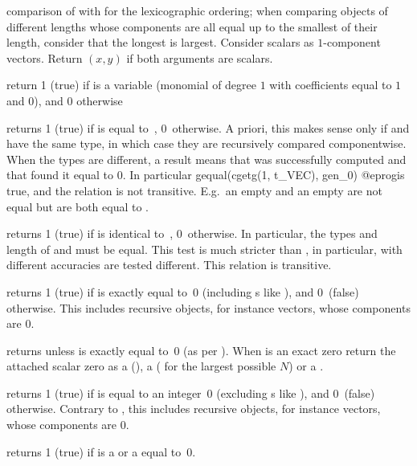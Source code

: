  comparison of  with  for the
lexicographic ordering; when comparing objects of different lengths whose
components are all equal up to the smallest of their length, consider that
the longest is largest. Consider scalars as $1$-component vectors. Return
$(x,y)$ if both arguments are scalars.

 return 1 (true) if  is a variable
(monomial of degree $1$ with  coefficients equal to $1$ and $0$),
and $0$ otherwise

 returns 1 (true) if  is equal
to~, 0~otherwise. A priori, this makes sense only if  and
 have the same type, in which case they are recursively compared
componentwise. When the types are different, a  result
means that  was successfully computed and that
 found it equal to $0$. In particular
\bprog
  gequal(cgetg(1, t_VEC), gen_0)
@eprog\noindent is true, and the relation is not transitive. E.g.~an empty
 and an empty  are not equal but are both equal to
.

 returns 1 (true) if  is identical
to~, 0~otherwise. In particular, the types and length of  and
 must be equal. This test is much stricter than , in
particular,  with different accuracies are tested different. This
relation is transitive.


 returns 1 (true) if  is exactly equal
to~0 (including s like ), and 0~(false) otherwise.
This includes recursive objects, for instance vectors, whose components are $0$.

 returns  unless  is exactly
equal to~0 (as per ). When  is an exact zero
return the attached scalar zero as a  (),
a  ( for the largest possible $N$) or a
.

 returns 1 (true) if  is equal
to an integer~0 (excluding s like ), and 0~(false)
otherwise. Contrary to , this includes recursive objects, for
instance vectors, whose components are $0$.

 returns 1 (true) if  is a  or
a  equal to~0.

